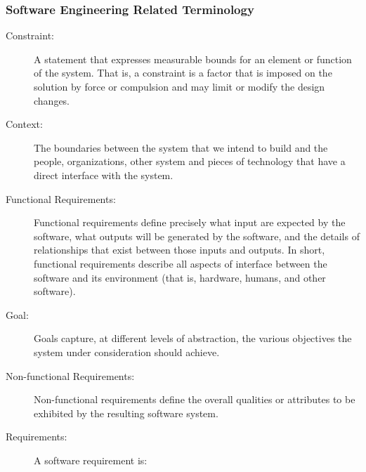 \documentclass[12pt,titlepage]{article}
\begin{document}
\subsubsection{Software Engineering Related Terminology\label{AreqSEterm}}
\begin{description}

\item[Constraint:] A statement that expresses measurable bounds for an element or function of the system. That is, a constraint is a factor that is imposed on the solution by force or compulsion and may limit or modify the design changes. \citep{IEEE1998}

\item[Context:] The boundaries between the system that we intend to build and the people, organizations, other system and pieces of technology that have a direct interface with the system. \citep{Volere2001}

\item[Functional Requirements:] Functional requirements define precisely what input are expected by the software, what outputs will be generated by the software, and the details of relationships that exist between those inputs and outputs. In short, functional requirements describe all aspects of interface between the software and its environment (that is, hardware, humans, and other software). \citep{Davis1990}

\item[Goal:] Goals capture, at different levels of abstraction, the various objectives the system under
consideration should achieve. \citep{Lamsweerde2001}

\item[Non-functional Requirements:] Non-functional requirements define the overall qualities or attributes to be exhibited by the resulting software system. \citep{Davis1990}

\item[Requirements:] A software requirement is:  \citep{IEEE2000}


\end{description}
\end{document}
